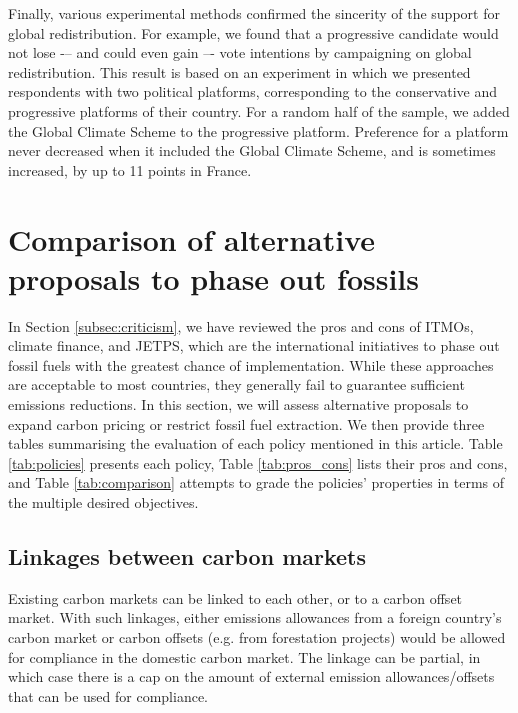 \documentclass[12pt,english]{article}
\begin{document}
Finally, various experimental methods confirmed the sincerity of the support for global redistribution. For example, we found that a progressive candidate would not lose -– and could even gain –- vote intentions by campaigning on global redistribution. This result is based on an experiment in which we presented respondents with two political platforms, corresponding to the conservative and progressive platforms of their country. For a random half of the sample, we added the Global Climate Scheme to the progressive platform. Preference for a platform never decreased when it included the Global Climate Scheme, and is sometimes increased, by up to 11 points in France.


\section{Comparison of alternative proposals to phase out fossils} %

In Section \ref{subsec:criticism}, we have reviewed the pros and cons of ITMOs, climate finance, and JETPS, which are the international initiatives to phase out fossil fuels with the greatest chance of implementation. While these approaches are acceptable to most countries, they generally fail to guarantee sufficient emissions reductions. In this section, we will assess alternative proposals to expand carbon pricing or restrict fossil fuel extraction. We then provide three tables summarising the evaluation of each policy mentioned in this article.  Table \ref{tab:policies} presents each policy, Table \ref{tab:pros_cons} lists their pros and cons, and Table \ref{tab:comparison} attempts to grade the policies' properties in terms of the multiple desired objectives. 

\subsection{Linkages between carbon markets}

Existing carbon markets can be linked to each other, or to a carbon offset market.\citep{jaffe_linking_2010} With such linkages, either emissions allowances from a foreign country's carbon market or carbon offsets (e.g. from forestation projects) would be allowed for compliance in the domestic carbon market. The linkage can be partial, in which case there is a cap on the amount of external emission allowances/offsets that can be used for compliance. 
\end{document}
